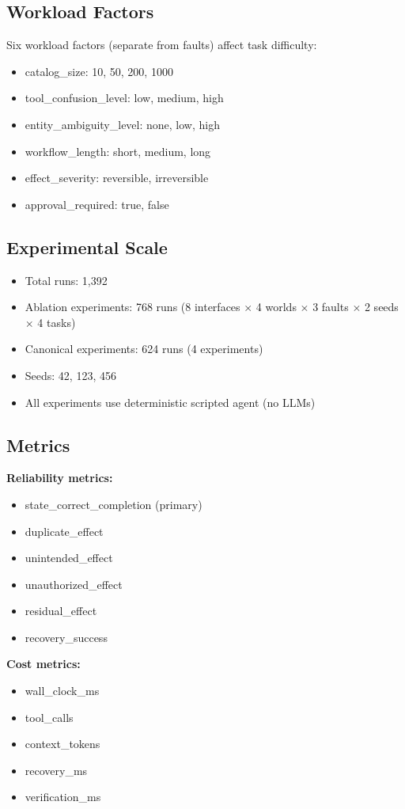 \subsection{Workload Factors}
Six workload factors (separate from faults) affect task difficulty:
\begin{itemize}
    \item catalog\_size: 10, 50, 200, 1000
    \item tool\_confusion\_level: low, medium, high
    \item entity\_ambiguity\_level: none, low, high
    \item workflow\_length: short, medium, long
    \item effect\_severity: reversible, irreversible
    \item approval\_required: true, false
\end{itemize}

\subsection{Experimental Scale}
\begin{itemize}
    \item Total runs: 1,392
    \item Ablation experiments: 768 runs (8 interfaces $\times$ 4 worlds $\times$ 3 faults $\times$ 2 seeds $\times$ 4 tasks)
    \item Canonical experiments: 624 runs (4 experiments)
    \item Seeds: 42, 123, 456
    \item All experiments use deterministic scripted agent (no LLMs)
\end{itemize}

\subsection{Metrics}
\textbf{Reliability metrics:}
\begin{itemize}
    \item state\_correct\_completion (primary)
    \item duplicate\_effect
    \item unintended\_effect
    \item unauthorized\_effect
    \item residual\_effect
    \item recovery\_success
\end{itemize}

\textbf{Cost metrics:}
\begin{itemize}
    \item wall\_clock\_ms
    \item tool\_calls
    \item context\_tokens
    \item recovery\_ms
    \item verification\_ms
\end{itemize}

